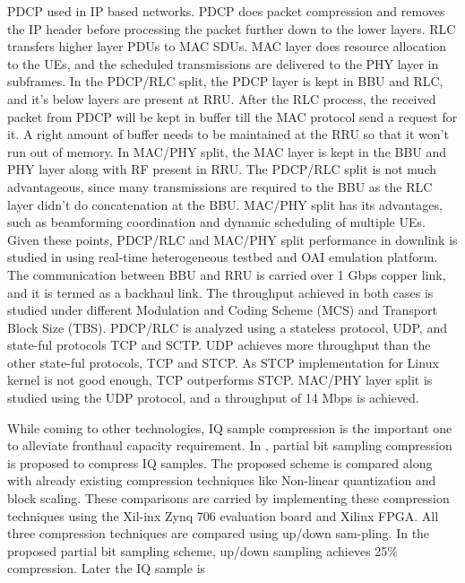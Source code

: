 \begin{multicols}{2}
\begin{itemize}
PDCP used in IP based networks. PDCP does packet compression and removes the IP header before processing the packet further down to the lower layers. RLC transfers higher layer PDUs to MAC SDUs. MAC layer does resource allocation to the UEs, and the scheduled transmissions are delivered to the PHY layer in subframes. In the PDCP/RLC split, the PDCP layer is kept in BBU and RLC, and it’s below layers are present at RRU. After the RLC process, the received packet from PDCP will be kept in buffer till the MAC protocol send a request for it. A right amount of buffer needs to be maintained at the RRU so that it won’t run out of memory. In MAC/PHY split, the MAC layer is kept in the BBU and PHY layer along with RF present in RRU. The PDCP/RLC split is not much advantageous, since many transmissions are required to the BBU as the RLC layer didn’t do concatenation at the BBU. MAC/PHY split has its advantages, such as beamforming coordination and dynamic scheduling of multiple UEs. Given these points, PDCP/RLC and MAC/PHY split performance in downlink is studied in \cite{art3-key77} using real-time heterogeneous testbed and OAI emulation platform. The communication between BBU and RRU is carried over 1 Gbps copper link, and it is termed as a backhaul link. The throughput achieved in both cases is studied under different Modulation and Coding Scheme (MCS) and Transport Block Size (TBS). PDCP/RLC is analyzed using a stateless protocol, UDP, and state-ful protocols TCP and SCTP. UDP achieves more throughput than the other state-ful protocols, TCP and STCP. As STCP implementation for Linux kernel is not good enough, TCP outperforms STCP. MAC/PHY layer split is studied using the UDP protocol, and a throughput of 14 Mbps is achieved. 

While coming to other technologies, IQ sample compression is the important one to alleviate fronthaul capacity requirement. In \cite{art3-key78}, partial bit sampling compression is proposed to compress IQ samples. The proposed scheme is compared along with already existing compression techniques like Non-linear quantization and block scaling. These comparisons are carried by implementing these compression techniques using the Xil-inx Zynq 706 evaluation board and Xilinx FPGA. All three compression techniques are compared using up/down sam-pling. In the proposed partial bit sampling scheme, up/down sampling achieves 25\% compression. Later the IQ sample is


\end{itemize}
\end{multicols}
